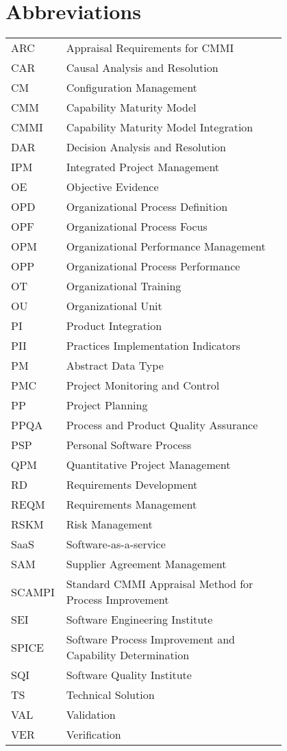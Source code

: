 \chapter*{Abbreviations}

\begin{flushleft}
\begin{tabular}{l p{0.8\linewidth}}
ARC & Appraisal Requirements for CMMI\\
CAR & Causal Analysis and Resolution\\
CM & Configuration Management\\
CMM & Capability Maturity Model\\
CMMI & Capability Maturity Model Integration\\
DAR & Decision Analysis and Resolution\\
IPM & Integrated Project Management\\
OE & Objective Evidence\\
OPD & Organizational Process Definition\\
OPF & Organizational Process Focus\\
OPM & Organizational Performance Management\\
OPP & Organizational Process Performance\\
OT & Organizational Training\\
OU & Organizational Unit\\
PI & Product Integration\\
PII & Practices Implementation Indicators\\
PM & Abstract Data Type\\
PMC & Project Monitoring and Control\\
PP & Project Planning\\
PPQA & Process and Product Quality Assurance\\
PSP & Personal Software Process\\
QPM & Quantitative Project Management\\
RD & Requirements Development\\
REQM & Requirements Management\\
RSKM & Risk Management\\
SaaS & Software-as-a-service\\
SAM & Supplier Agreement Management\\
SCAMPI & Standard CMMI Appraisal Method for Process Improvement\\
SEI & Software Engineering Institute\\
SPICE & Software Process Improvement and Capability Determination\\
SQI & Software Quality Institute\\
TS & Technical Solution\\
VAL & Validation\\
VER & Verification\\
\end{tabular}
\end{flushleft}

